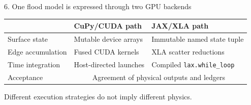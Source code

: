 \documentclass[aspectratio=169,10pt]{beamer}
\begin{document}
\begin{frame}{6. One flood model is expressed through two GPU backends}
\centering
{}

\vspace{5mm}
\begin{tabularx}{0.90\textwidth}{@{}lXX@{}}
\toprule
& \textbf{CuPy/CUDA path} & \textbf{JAX/XLA path}\\
\midrule
Surface state & Mutable device arrays & Immutable named state tuple\\
Edge accumulation & Fused CUDA kernels & XLA scatter reductions\\
Time integration & Host-directed launches & Compiled \texttt{lax.while\_loop}\\
Acceptance & \multicolumn{2}{c}{Agreement of physical outputs and ledgers}\\
\bottomrule
\end{tabularx}

\vspace{2mm}
\centering\small Different execution strategies do not imply different physics.
\end{frame}
\end{document}
